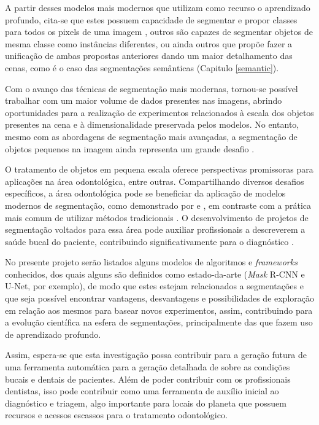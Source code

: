 A partir desses modelos mais modernos que utilizam como recurso o aprendizado profundo, cita-se que estes possuem capacidade de segmentar e propor classes para todos os pixels de uma imagem \citep{Minaee2021}, outros são capazes de segmentar objetos de mesma classe como instâncias diferentes, ou ainda outros que propõe fazer a unificação de ambas propostas anteriores dando um maior detalhamento das cenas, como é o caso das segmentações semânticas (Capitulo \ref{semantic}).

Com o avanço das técnicas de segmentação mais modernas, tornou-se possível trabalhar com um maior volume de dados presentes nas imagens, abrindo oportunidades para a realização de experimentos relacionados à escala dos objetos presentes na cena e à dimensionalidade preservada pelos modelos. No entanto, mesmo com as abordagens de segmentação mais avançadas, a segmentação de objetos pequenos na imagem ainda representa um grande desafio \citep{Sang2023Small-ObjectAttention, Su2021Small-scaleFusion}.

O tratamento de objetos em pequena escala oferece perspectivas promissoras para aplicações na área odontológica, entre outras. Compartilhando diversos desafios específicos, a área odontológica pode se beneficiar da aplicação de modelos modernos de segmentação, como demonstrado por \cite{Ghazvinian2021} e \cite{Minyoung2020}, em contraste com a prática mais comum de utilizar métodos tradicionais \citep{Hammad2020}. O desenvolvimento de projetos de segmentação voltados para essa área pode auxiliar profissionais a descreverem a saúde bucal do paciente, contribuindo significativamente para o diagnóstico \citep{Ghazvinian2021}.

No presente projeto serão listados alguns modelos de algoritmos e \textit{frameworks} conhecidos, dos quais alguns são definidos como estado-da-arte (\textit{Mask} R-CNN e U-Net, por exemplo), de modo que estes estejam relacionados a segmentações e que seja possível encontrar vantagens, desvantagens e possibilidades de exploração em relação aos mesmos para basear novos experimentos, assim, contribuindo para a evolução científica na esfera de segmentações, principalmente das que fazem uso de aprendizado profundo.

Assim, espera-se que esta investigação possa contribuir para a geração futura de uma ferramenta automática para a geração detalhada de sobre as condições bucais e dentais de pacientes. Além de poder contribuir com os profissionais dentistas, isso pode contribuir como uma ferramenta de auxílio inicial ao diagnóstico e triagem, algo importante para locais do planeta que possuem recursos e acessos escassos para o tratamento odontológico.

